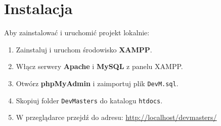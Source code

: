 \documentclass[a4paper,12pt]{article}
\begin{document}
\section{Instalacja}
Aby zainstalować i uruchomić projekt lokalnie:
\begin{enumerate}
  \item Zainstaluj i uruchom środowisko \textbf{XAMPP}.
  \item Włącz serwery \textbf{Apache} i \textbf{MySQL} z panelu XAMPP.
  \item Otwórz \textbf{phpMyAdmin} i zaimportuj plik \texttt{DevM.sql}.
  \item Skopiuj folder \texttt{DevMasters} do katalogu \texttt{htdocs}.
  \item W przeglądarce przejdź do adresu: \url{http://localhost/devmasters/}
\end{enumerate}

\newpage
\end{document}

